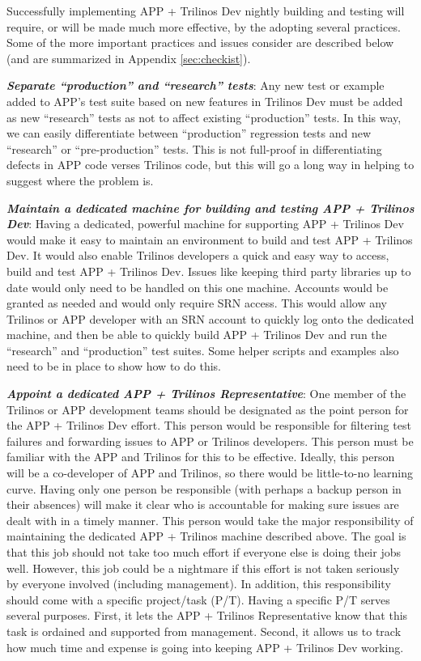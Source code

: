 \documentclass[pdf,ps2pdf,11pt]{SANDreport}
\begin{document}
Successfully implementing APP + Trilinos Dev nightly building and testing will
require, or will be made much more effective, by the adopting several
practices.  Some of the more important practices and issues consider are
described below (and are summarized in Appendix {}\ref{sec:checkist}).

{}\textit{\textbf{Separate ``production'' and ``research'' tests}}: Any new
test or example added to APP's test suite based on new features in Trilinos
Dev must be added as new ``research'' tests as not to affect existing
``production'' tests.  In this way, we can easily differentiate between
``production'' regression tests and new ``research'' or ``pre-production''
tests.  This is not full-proof in differentiating defects in APP code verses
Trilinos code, but this will go a long way in helping to suggest where the
problem is.

{}\textit{\textbf{Maintain a dedicated machine for building and testing APP +
Trilinos Dev}}: Having a dedicated, powerful machine for supporting APP +
Trilinos Dev would make it easy to maintain an environment to build and test
APP + Trilinos Dev.  It would also enable Trilinos developers a quick and easy
way to access, build and test APP + Trilinos Dev.  Issues like keeping third
party libraries up to date would only need to be handled on this one machine.
Accounts would be granted as needed and would only require SRN access.  This
would allow any Trilinos or APP developer with an SRN account to quickly log
onto the dedicated machine, and then be able to quickly build APP + Trilinos
Dev and run the ``research'' and ``production'' test suites.  Some helper
scripts and examples also need to be in place to show how to do this.

{}\textit{\textbf{Appoint a dedicated APP + Trilinos Representative}}: One
member of the Trilinos or APP development teams should be designated as the
point person for the APP + Trilinos Dev effort.  This person would be
responsible for filtering test failures and forwarding issues to APP or
Trilinos developers.  This person must be familiar with the APP and Trilinos
for this to be effective.  Ideally, this person will be a co-developer of APP
and Trilinos, so there would be little-to-no learning curve.  Having only one
person be responsible (with perhaps a backup person in their absences) will
make it clear who is accountable for making sure issues are dealt with in a
timely manner.  This person would take the major responsibility of maintaining
the dedicated APP + Trilinos machine described above. The goal is that this
job should not take too much effort if everyone else is doing their jobs well.
However, this job could be a nightmare if this effort is not taken seriously
by everyone involved (including management).  In addition, this responsibility
should come with a specific project/task (P/T).  Having a specific P/T serves
several purposes.  First, it lets the APP + Trilinos Representative know that
this task is ordained and supported from management.  Second, it allows us to
track how much time and expense is going into keeping APP + Trilinos Dev
working.
\end{document}

